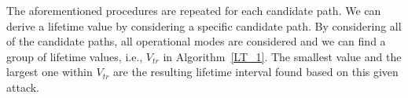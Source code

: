 The aforementioned procedures are repeated for each candidate path. We can derive a lifetime value by considering a specific candidate path. By considering all of the candidate
paths, all operational modes are considered and we can find a group of lifetime values, i.e., $V_{tr}$ in Algorithm~\ref{LT_1}. The smallest value and the largest one within $V_{tr}$ are the resulting lifetime interval found based on this given attack.